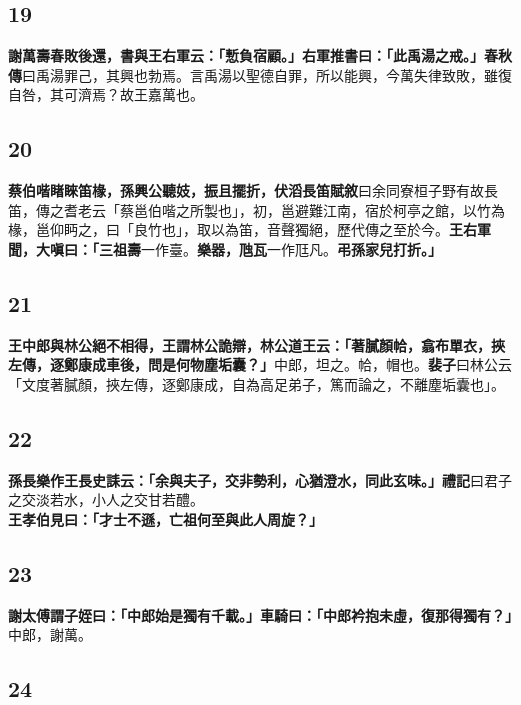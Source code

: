 \subsection*{19}

\textbf{謝萬壽春敗後還，書與王右軍云：「慙負宿顧。」右軍推書曰：「此禹湯之戒。」}{\footnotesize \textbf{春秋傳}曰禹湯罪己，其興也勃焉。言禹湯以聖德自罪，所以能興，今萬失律致敗，雖復自咎，其可濟焉？故王嘉萬也。}

\subsection*{20}

\textbf{蔡伯喈睹睞笛椽，孫興公聽妓，振且擺折，}{\footnotesize \textbf{伏滔長笛賦敘}曰余同寮桓子野有故長笛，傳之耆老云「蔡邕伯喈之所製也」，初，邕避難江南，宿於柯亭之館，以竹為椽，邕仰眄之，曰「良竹也」，取以為笛，音聲獨絕，歷代傳之至於今。}\textbf{王右軍聞，大嗔曰：「三祖壽}{\footnotesize 一作臺。}\textbf{樂器，虺瓦}{\footnotesize 一作尫凡。}\textbf{弔孫家兒打折。」}

\subsection*{21}

\textbf{王中郎與林公絕不相得，王謂林公詭辯，林公道王云：「著膩顏帢，翕布單衣，挾左傳，逐鄭康成車後，問是何物塵垢囊？」}{\footnotesize 中郎，坦之。帢，帽也。\textbf{裴子}曰林公云「文度著膩顏，挾左傳，逐鄭康成，自為高足弟子，篤而論之，不離塵垢囊也」。}

\subsection*{22}

\textbf{孫長樂作王長史誄云：「余與夫子，交非勢利，心猶澄水，同此玄味。」}{\footnotesize \textbf{禮記}曰君子之交淡若水，小人之交甘若醴。}\textbf{王孝伯見曰：「才士不遜，亡祖何至與此人周旋？」}

\subsection*{23}

\textbf{謝太傅謂子姪曰：「中郎始是獨有千載。」車騎曰：「中郎衿抱未虛，復那得獨有？」}{\footnotesize 中郎，謝萬。}

\subsection*{24}

